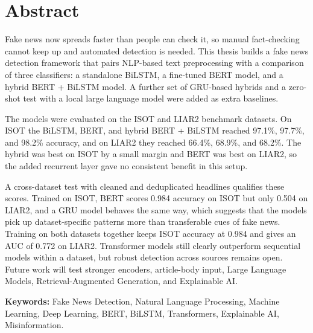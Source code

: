 
\sloppy
\chapter*{\centering Abstract}
\onehalfspacing

Fake news now spreads faster than people can check it, so manual fact-checking cannot keep up and automated detection is needed. This thesis builds a fake news detection framework that pairs NLP-based text preprocessing with a comparison of three classifiers: a standalone BiLSTM, a fine-tuned BERT model, and a hybrid BERT + BiLSTM model. A further set of GRU-based hybrids and a zero-shot test with a local large language model were added as extra baselines.

The models were evaluated on the ISOT and LIAR2 benchmark datasets. On ISOT the BiLSTM, BERT, and hybrid BERT + BiLSTM reached 97.1\%, 97.7\%, and 98.2\% accuracy, and on LIAR2 they reached 66.4\%, 68.9\%, and 68.2\%. The hybrid was best on ISOT by a small margin and BERT was best on LIAR2, so the added recurrent layer gave no consistent benefit in this setup.

A cross-dataset test with cleaned and deduplicated headlines qualifies these scores. Trained on ISOT, BERT scores 0.984 accuracy on ISOT but only 0.504 on LIAR2, and a GRU model behaves the same way, which suggests that the models pick up dataset-specific patterns more than transferable cues of fake news. Training on both datasets together keeps ISOT accuracy at 0.984 and gives an AUC of 0.772 on LIAR2. Transformer models still clearly outperform sequential models within a dataset, but robust detection across sources remains open. Future work will test stronger encoders, article-body input, Large Language Models, Retrieval-Augmented Generation, and Explainable AI.

\vspace{0.5in}
\noindent
{\bf Keywords:} Fake News Detection, Natural Language Processing, Machine Learning, Deep Learning, BERT, BiLSTM, Transformers, Explainable AI, Misinformation.
